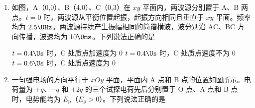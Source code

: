\documentclass[\gkver]{gaokaozhenti}
\begin{document}
\begin{enumerate}
{灯泡两端的电压为 $U_{2}=\frac{U_{1}}{k}=\frac{kU}{k^{2}+3}$

B 正确；

C．S 与 b 相连，变压器原线圈电路接入两个电阻，变压器原线圈的电流 $I_{1}=\frac{U}{k^{2}R+2R}$

流过灯泡的电流 $I_{2}=kI_{1}=\frac{kU}{(k^{2}+2)R}$

C 错误；

D．S 与 c 相连，变压器原线圈电路接入一个电阻，变压器原线圈的电流 $I_{1}'=\frac{U}{k^{2}R+R}$

$I_{2}'=kI_{1}'=\frac{kU}{(k^{2}+1)R}$

灯泡的电功率为 $P_{L}=I_{2}^{2}R_{L}=\frac{k^{2}U^{2}}{(k^{2}+1)^{2}R}$

D 错误。

故选 B。
}

\item
如图，A（0,0）、B（4,0）、C（0,3）在 $xy$ 平面内，两波源分别置于 A、B 两点。$t=0$ 时，两波源从平衡位置起振，起振方向相同且垂直于 $xy$ 平面。频率均为 $2.5 \UHz$。两波源持续产生振幅相同的简谐横波，波分别沿 AC、BC 方向传播，波速均为 $10 \Ums$。下列说法正确的是


{$t=0.4 \Us$ 时，C 处质点加速度为 0}
{$t=0.4 \Us$ 时，C 处质点速度不为 0}
{$t=0.6 \Us$ 时，C 处质点速度为 0}


\item
一匀强电场的方向平行于 $xOy$ 平面，平面内 A 点和 B 点的位置如图所示。电荷量为 $+q$、$-q$ 和 $+2q$ 的三个试探电荷先后分别置于 O 点、A 点和 B 点时，电势能均为 $E_{\mathrm{p}}$（$E_{\mathrm{p}}>0$）。下列说法正确的是


\end{enumerate}
\end{document}
